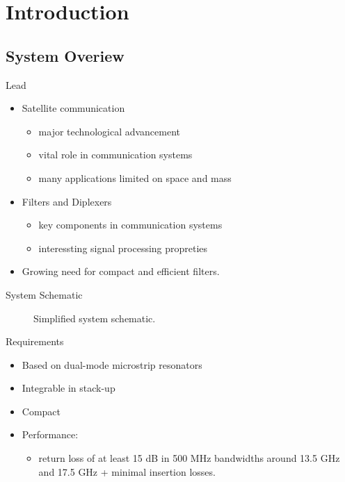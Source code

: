 \documentclass[student,english]{ihfBeamer} %
\begin{document}
\titleframe

\contentframe

\section{Introduction}
\contentframe

\subsection{System Overiew}

\begin{frame}{Lead}
	\begin{itemize}
		\item Satellite communication
		\begin{itemize}
			\item major technological advancement
			\item vital role in communication systems
			\item many applications limited on space and mass
		\end{itemize}
		\item Filters and Diplexers
		\begin{itemize}
			\item key components in communication systems
			\item interessting signal processing propreties
		\end{itemize}
		\item Growing need for compact and efficient filters.
	\end{itemize}
\end{frame}

\begin{frame}{System Schematic}
	\begin{figure}[H]
		\caption{Simplified system schematic.}
	\end{figure}
\end{frame}	

\begin{frame}{Requirements}
\begin{itemize}
	
\item Based on dual-mode microstrip resonators
\item Integrable in stack-up
\item Compact
\item Performance:
\begin{itemize}
	\item return loss of at least 15 dB in 500 MHz bandwidths around 13.5 GHz and 17.5 GHz + minimal insertion losses.
\end{itemize}
\end{itemize}
\end{frame}	
	
\end{document}
